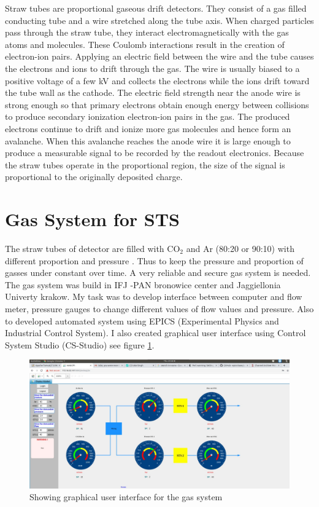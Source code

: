 Straw tubes are proportional gaseous drift detectors. They consist of a gas filled conducting tube and a wire stretched along the tube axis. When charged particles pass through the straw tube, they interact electromagnetically with the gas atoms and molecules. These Coulomb interactions result in the creation of electron-ion pairs. Applying an electric field between the wire and the tube causes the electrons and ions to drift through the gas. The wire is usually biased to a positive voltage of a few kV and collects the electrons while the ions drift toward the tube wall as the cathode. The electric field strength near the anode wire is strong enough so that primary electrons obtain enough energy between collisions to produce secondary ionization electron-ion pairs in the gas. The produced electrons continue to drift and ionize more gas molecules and hence form an avalanche. When this avalanche reaches the anode wire it is large enough to produce a measurable signal to be recorded by the readout electronics. Because the straw tubes operate in the proportional region, the size of the signal is proportional to the originally deposited charge.
\section{Gas System for STS}
The straw tubes of detector are filled with CO$_{2}$ and Ar (80:20 or 90:10)  with different proportion and pressure . Thus to keep the pressure and proportion of gasses under constant over time. A very reliable and secure gas system is needed. The gas system was build in IFJ -PAN bronowice center and Jaggiellonia Univerty krakow. My task was to develop interface between computer and flow meter, pressure gauges to change different values of flow values and pressure. Also to developed  automated system using EPICS (Experimental Physics and Industrial Control System). I also created graphical user interface using Control System Studio (CS-Studio) see figure \ref{fig:fig5.1}.  
\begin{figure}
    \centering
    \includegraphics[width=1.0\textwidth]{images/webopi.jpg}
    \caption{Showing graphical user interface for the gas system}
    \label{fig:fig5.1}
\end{figure}
